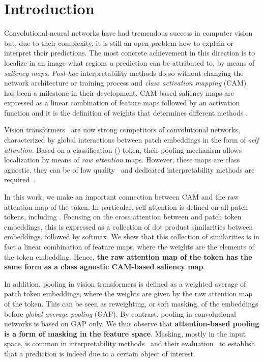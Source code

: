 \section{Introduction}
\label{sec:intro}

Convolutional neural networks have had tremendous success in computer vision~\cite{he2016deep,liu2022convnet} but, due to their complexity, it is still an open problem how to explain or interpret their predictions. The most concrete achievement in this direction is to localize in an image what regions a prediction can be attributed to, by means of \emph{saliency maps}. \emph{Post-hoc} interpretability methods do so without changing the network architecture or training process and \emph{class activation mapping} (CAM)~\cite{zhou2016learning} has been a milestone in their development. CAM-based saliency maps are expressed as a linear combination of feature maps followed by an activation function and it is the definition of weights that determines different methods \cite{DBLP:journals/corr/SelvarajuDVCPB16,DBLP:journals/corr/abs-1710-11063,DBLP:journals/corr/abs-1910-01279}.


Vision transformers~\cite{dosovitskiy2020image} are now strong competitors of convolutional networks, characterized by global interactions between patch embeddings in the form of \emph{self attention}. 
Based on a classification (\cls) token, their pooling mechanism allows localization by means of \emph{raw attention} maps. However, these maps are class agnostic, they can be of low quality~\cite{dino} and dedicated interpretability methods are required~\cite{chefer2021transformer}.

In this work, we make an important connection between CAM and the raw attention map of the \cls token. 
In particular, self attention is defined on all patch tokens, including \cls. Focusing on the cross attention between \cls and patch token embeddings, this is expressed as a collection of dot product similarities between embeddings, followed by softmax. 
We show that this collection of similarities is in fact a linear combination of feature maps, where the weights are the elements of the \cls token embedding. Hence, \textbf{the raw attention map of the \cls token has the same form as a class agnostic CAM-based saliency map}.

In addition, pooling in vision transformers is defined as a weighted average of patch token embeddings, where the weights are given by the raw attention map of the \cls token. This can be seen as reweighting, or soft masking, of the embeddings before \emph{global average pooling} (GAP). By contrast, pooling in convolutional networks is based on GAP only. We thus observe that \textbf{attention-based pooling is a form of masking in the feature space}. Masking, mostly in the input space, is common in interpretability methods~\cite{DBLP:journals/corr/abs-1910-01279} and their evaluation~\cite{DBLP:journals/corr/abs-1710-11063, petsiuk2018rise} to establish that a prediction is indeed due to a certain object of interest.

